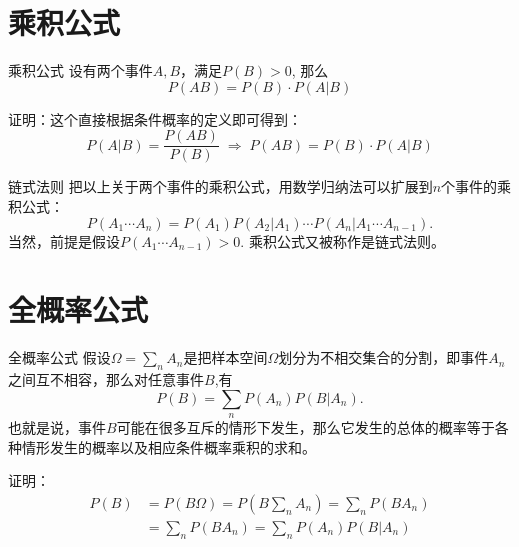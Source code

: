 
\section{乘积公式}


\begin{frame}

\begin{block}{乘积公式}
设有两个事件$A,B$，满足$P(B) > 0$, 那么
\[P(AB) = P(B)\cdot P(A|B)\]

\pause

证明：这个直接根据条件概率的定义即可得到：
\[P(A|B) = \dfrac{P(AB)}{P(B)} \; \Longrightarrow \; P(AB) = P(B)\cdot P(A|B)\]
\end{block}

\end{frame}


\begin{frame}

\begin{block}{链式法则}
把以上关于两个事件的乘积公式，用数学归纳法可以扩展到$n$个事件的乘积公式：
\[P(A_1\cdots A_n) = P(A_1)P(A_2|A_1)\cdots P(A_n|A_1\cdots A_{n-1}).\]
当然，前提是假设$P(A_1\cdots A_{n-1}) > 0.$ 乘积公式又被称作是链式法则。
\end{block}

\end{frame}


\section{全概率公式}


\begin{frame}

\begin{block}{全概率公式}
假设$\Omega = \sum\limits_n A_n$是把样本空间$\Omega$划分为不相交集合的分割，即事件$A_n$之间互不相容，那么对任意事件$B$,有
\[P(B) = \sum\limits_n P(A_n)P(B|A_n).\] \pause
也就是说，事件$B$可能在很多互斥的情形下发生，那么它发生的总体的概率等于各种情形发生的概率以及相应条件概率乘积的求和。
\end{block}

\vspace{1em}
\pause

证明：
\begin{align*}
P(B) & = P(B\Omega) = P(B\sum\limits_n A_n) = \sum\limits_n P(BA_n) \\
& = \sum\limits_n P(BA_n) = \sum\limits_n P(A_n)P(B|A_n)
\end{align*}
\end{frame}

